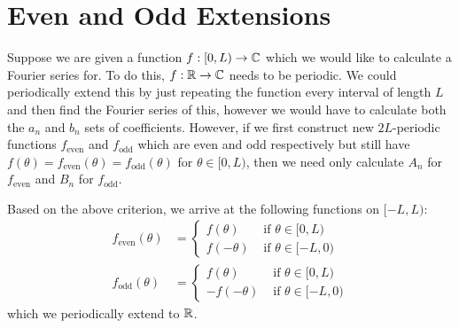 \documentclass[../main.tex]{subfiles}
\begin{document}
\begin{example}
\begin{center}
  \end{center}
\end{example}
\section{Even and Odd Extensions}
Suppose we are given a function $f: [0, L) \to \mathbb{C}$ which we would like to calculate a Fourier series for.
To do this, $f: \mathbb{R} \to \mathbb{C}$ needs to be periodic.
We could periodically extend this by just repeating the function every interval of length $L$ and then find the Fourier series of this, however we would have to calculate both the $a_n$ and $b_n$ sets of coefficients.
However, if we first construct new $2L$-periodic functions $f_{\text{even}}$ and $f_{\text{odd}}$ which are even and odd respectively but still have $f(\theta) = f_{\text{even}}(\theta) = f_{\text{odd}}(\theta)$  for $\theta \in [0, L)$, then we need only calculate $A_n$ for $f_{\text{even}}$ and $B_n$ for $f_{\text{odd}}$.

Based on the above criterion, we arrive at the following functions on $[-L, L)$:
\begin{align*}
  f_{\text{even}}(\theta) &= \begin{cases}
  f(\theta) & \text{ if } \theta \in [0, L) \\
  f(-\theta) & \text{ if } \theta \in [-L, 0)
  \end{cases} \\
  f_{\text{odd}}(\theta) &= \begin{cases}
  f(\theta) & \text{ if } \theta \in [0, L) \\
  -f(-\theta) & \text{ if } \theta \in [-L, 0)
  \end{cases}
\end{align*}
which we periodically extend to $\mathbb{R}$.
\end{document}
